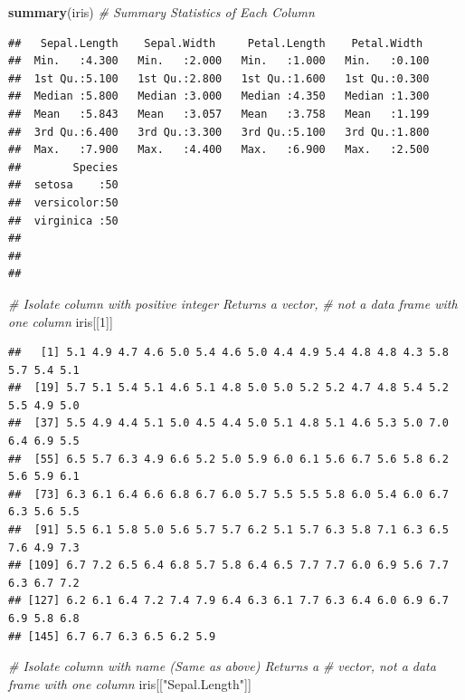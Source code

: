 \documentclass[
]{book}
\newenvironment{Shaded}{\begin{snugshade}}{\end{snugshade}}
\newcommand{\CommentTok}[1]{\textcolor[rgb]{0.56,0.35,0.01}{\textit{#1}}}
\newcommand{\DecValTok}[1]{\textcolor[rgb]{0.00,0.00,0.81}{#1}}
\newcommand{\KeywordTok}[1]{\textcolor[rgb]{0.13,0.29,0.53}{\textbf{#1}}}
\newcommand{\NormalTok}[1]{#1}
\newcommand{\StringTok}[1]{\textcolor[rgb]{0.31,0.60,0.02}{#1}}
\begin{document}
\begin{Shaded}
\begin{Highlighting}[]
\KeywordTok{summary}\NormalTok{(iris)  }\CommentTok{# Summary Statistics of Each Column }
\end{Highlighting}
\end{Shaded}

\begin{verbatim}
##   Sepal.Length    Sepal.Width     Petal.Length    Petal.Width   
##  Min.   :4.300   Min.   :2.000   Min.   :1.000   Min.   :0.100  
##  1st Qu.:5.100   1st Qu.:2.800   1st Qu.:1.600   1st Qu.:0.300  
##  Median :5.800   Median :3.000   Median :4.350   Median :1.300  
##  Mean   :5.843   Mean   :3.057   Mean   :3.758   Mean   :1.199  
##  3rd Qu.:6.400   3rd Qu.:3.300   3rd Qu.:5.100   3rd Qu.:1.800  
##  Max.   :7.900   Max.   :4.400   Max.   :6.900   Max.   :2.500  
##        Species  
##  setosa    :50  
##  versicolor:50  
##  virginica :50  
##                 
##                 
## 
\end{verbatim}

\begin{Shaded}
\begin{Highlighting}[]
\CommentTok{# Isolate column with positive integer Returns a vector,}
\CommentTok{# not a data frame with one column}
\NormalTok{iris[[}\DecValTok{1}\NormalTok{]]}
\end{Highlighting}
\end{Shaded}

\begin{verbatim}
##   [1] 5.1 4.9 4.7 4.6 5.0 5.4 4.6 5.0 4.4 4.9 5.4 4.8 4.8 4.3 5.8 5.7 5.4 5.1
##  [19] 5.7 5.1 5.4 5.1 4.6 5.1 4.8 5.0 5.0 5.2 5.2 4.7 4.8 5.4 5.2 5.5 4.9 5.0
##  [37] 5.5 4.9 4.4 5.1 5.0 4.5 4.4 5.0 5.1 4.8 5.1 4.6 5.3 5.0 7.0 6.4 6.9 5.5
##  [55] 6.5 5.7 6.3 4.9 6.6 5.2 5.0 5.9 6.0 6.1 5.6 6.7 5.6 5.8 6.2 5.6 5.9 6.1
##  [73] 6.3 6.1 6.4 6.6 6.8 6.7 6.0 5.7 5.5 5.5 5.8 6.0 5.4 6.0 6.7 6.3 5.6 5.5
##  [91] 5.5 6.1 5.8 5.0 5.6 5.7 5.7 6.2 5.1 5.7 6.3 5.8 7.1 6.3 6.5 7.6 4.9 7.3
## [109] 6.7 7.2 6.5 6.4 6.8 5.7 5.8 6.4 6.5 7.7 7.7 6.0 6.9 5.6 7.7 6.3 6.7 7.2
## [127] 6.2 6.1 6.4 7.2 7.4 7.9 6.4 6.3 6.1 7.7 6.3 6.4 6.0 6.9 6.7 6.9 5.8 6.8
## [145] 6.7 6.7 6.3 6.5 6.2 5.9
\end{verbatim}

\begin{Shaded}
\begin{Highlighting}[]
\CommentTok{# Isolate column with name (Same as above) Returns a}
\CommentTok{# vector, not a data frame with one column}
\NormalTok{iris[[}\StringTok{"Sepal.Length"}\NormalTok{]]}
\end{Highlighting}
\end{Shaded}
\end{document}
